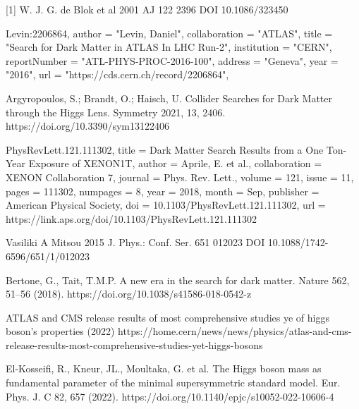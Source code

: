 \documentclass[]{article}
\begin{document}
[1] W. J. G. de Blok et al 2001 AJ 122 2396 DOI 10.1086/323450

\par
\noindent
[2] Levin:2206864,
      author        = "Levin, Daniel",
      collaboration = "ATLAS",
      title         = "{Search for Dark Matter in ATLAS In LHC Run-2}",
      institution   = "CERN",
      reportNumber  = "ATL-PHYS-PROC-2016-100",
      address       = "Geneva",
      year          = "2016",
      url           = "https://cds.cern.ch/record/2206864", 


\par
\noindent
[3] Argyropoulos, S.; Brandt, O.; Haisch, U. Collider Searches for Dark Matter 
through the Higgs Lens. Symmetry 2021, 13, 2406. 
https://doi.org/10.3390/sym13122406 \par
\noindent
[4] PhysRevLett.121.111302,
  title = {Dark Matter Search Results from a One Ton-Year Exposure of XENON1T},
  author = {Aprile, E. et al.},
  collaboration = {XENON Collaboration  7},
  journal = {Phys. Rev. Lett.},
  volume = {121},
  issue = {11},
  pages = {111302},
  numpages = {8},
  year = {2018},
  month = {Sep},
  publisher = {American Physical Society},
  doi = {10.1103/PhysRevLett.121.111302},
  url = {https://link.aps.org/doi/10.1103/PhysRevLett.121.111302}
\par
\noindent
[5] Vasiliki A Mitsou 2015 J. Phys.: Conf. Ser. 651 012023  DOI 10.1088/1742-6596/651/1/012023

\par
\noindent
[6] Bertone, G., Tait, T.M.P. A new era in the search for dark matter. 
Nature 562, 51–56 (2018). https://doi.org/10.1038/s41586-018-0542-z
\par
\noindent
[7] ATLAS and CMS release results of most comprehensive studies ye of higgs boson's
properties (2022)
https://home.cern/news/news/physics/atlas-and-cms-release-results-most-comprehensive-studies-yet-higgs-bosons
\par
\noindent
[8] El-Kosseifi, R., Kneur, JL., Moultaka, G. et al. The Higgs boson mass as 
fundamental parameter of the minimal supersymmetric standard model. Eur. Phys. 
J. C 82, 657 (2022). https://doi.org/10.1140/epjc/s10052-022-10606-4 
\end{document}
